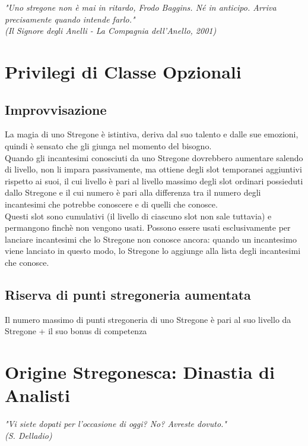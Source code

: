 
\begin{DndReadAloud}
    \it
    "Uno stregone non è mai in ritardo, Frodo Baggins. Né in anticipo. Arriva precisamente quando intende farlo." \\ (Il Signore degli Anelli - La Compagnia dell'Anello, 2001)
  \end{DndReadAloud}

\section{Privilegi di Classe Opzionali}

\subsection{Improvvisazione}

La magia di uno Stregone è istintiva, deriva dal suo talento e dalle sue emozioni, quindi è sensato che gli giunga nel momento del bisogno. \\ Quando gli incantesimi conosciuti da uno Stregone dovrebbero aumentare salendo di livello, non li impara passivamente, ma ottiene degli slot temporanei aggiuntivi rispetto ai suoi, il cui livello è pari al livello massimo degli slot ordinari possieduti dallo Stregone e il cui numero è pari alla differenza tra il numero degli incantesimi che potrebbe conoscere e di quelli che conosce. \\ Questi slot sono cumulativi (il livello di ciascuno slot non sale tuttavia) e permangono finchè non vengono usati. Possono essere usati esclusivamente per lanciare incantesimi che lo Stregone non conosce ancora: quando un incantesimo viene lanciato in questo modo, lo Stregone lo aggiunge alla lista degli incantesimi che conosce.

\subsection{Riserva di punti stregoneria aumentata}

Il numero massimo di punti stregoneria di uno Stregone è pari al suo livello da Stregone + il suo bonus di competenza

\section{Origine Stregonesca: Dinastia di Analisti}

\begin{DndReadAloud}
  \it
  "Vi siete dopati per l'occasione di oggi? No? Avreste dovuto." \\ (S. Delladio)
\end{DndReadAloud}

